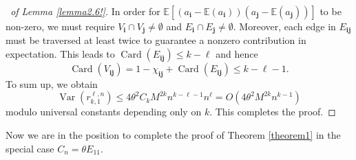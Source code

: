 \documentclass[12pt, reqno]{amsart}
\theoremstyle{definition}
\theoremstyle{remark}
\numberwithin{equation}{section}
\begin{document}
\begin{proof}[\proofname\ of Lemma \ref{lemma2.6!}]
In order for $\mathbb{E}\left[(a_\mathbf{i}-\mathbb{E}(a_\mathbf{i}))(a_\mathbf{j}-\mathbb{E}(a_\mathbf{j}))\right]$ to be non-zero, we must require $V_\mathbf{i}\cap V_\mathbf{j}\neq\emptyset$ and $E_\mathbf{i}\cap E_\mathbf{j}\neq\emptyset$. Moreover, each edge in $E_{\mathbf{i}\mathbf{j}}$ must be traversed at least twice to guarantee a nonzero contribution in expectation. This leads to $\operatorname{Card}(E_{\mathbf{i}\mathbf{j}})\leq k-\ell$ and hence 
$$
\operatorname{Card}(V_{\mathbf{i}\mathbf{j}})=1-\chi_{\mathbf{i}\mathbf{j}}+\operatorname{Card}(E_{\mathbf{i}\mathbf{j}})\leq k-\ell-1.
$$
To sum up, we obtain 
$$
\operatorname{Var}(r_{k,1}^{\ell,n})\leq 4\theta^2 C_k M^{2k}n^{k-\ell-1}n^{\ell}=O(4\theta^2  M^{2k}n^{k-1})
$$
modulo universal constants depending only on $k$. This completes the proof.
\end{proof}

Now we are in the position to complete the proof of Theorem \ref{theorem1} in the special case $C_n=\theta E_{11}$.
\end{document}
